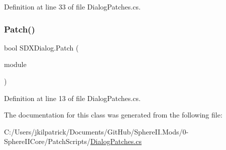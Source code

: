 Definition at line 33 of file Dialog\+Patches.\+cs.

\mbox{\label{class_s_d_x_dialog_a5ce84a3de0f89acb59cea0a370102eb7}} 
\subsubsection{\texorpdfstring{Patch()}{Patch()}}
{\footnotesize\ttfamily bool S\+D\+X\+Dialog.\+Patch (\begin{DoxyParamCaption}\item[{Module\+Definition}]{module }\end{DoxyParamCaption})}



Definition at line 13 of file Dialog\+Patches.\+cs.



The documentation for this class was generated from the following file\+:\begin{DoxyCompactItemize}
\item 
C\+:/\+Users/jkilpatrick/\+Documents/\+Git\+Hub/\+Sphere\+I\+I.\+Mods/0-\/\+Sphere\+I\+I\+Core/\+Patch\+Scripts/\mbox{\hyperlink{_dialog_patches_8cs}{Dialog\+Patches.\+cs}}\end{DoxyCompactItemize}
